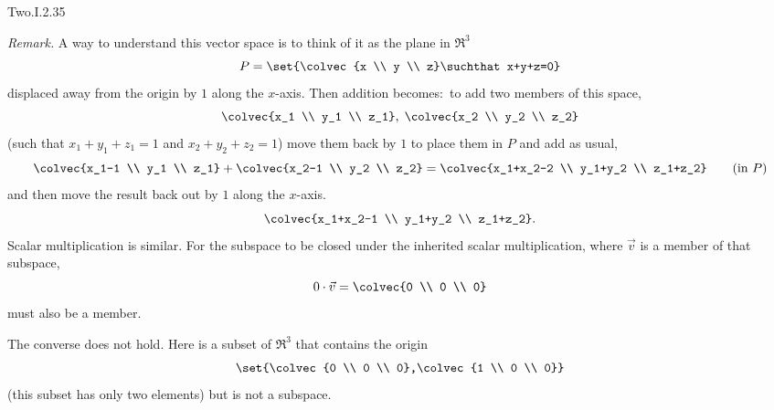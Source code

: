 \begin{ans}{Two.I.2.35}
\begin{exparts}
           \textit{Remark.}
           A way to understand this vector space is to think of it as
           the plane in $\Re^3$
           \begin{equation*}
             P=\set{\colvec{x \\ y \\ z}\suchthat x+y+z=0}
           \end{equation*}
           displaced away from the origin by $1$ along the $x$-axis.
           Then addition becomes:~to add two members of this space,
           \begin{equation*}
             \colvec{x_1 \\ y_1 \\ z_1},\;\colvec{x_2 \\ y_2 \\ z_2}
           \end{equation*}
           (such that $x_1+y_1+z_1=1$ and $x_2+y_2+z_2=1$)
           move them back by $1$ to place them in $P$ and
           add as usual,
           \begin{equation*}
             \colvec{x_1-1 \\ y_1 \\ z_1}+\colvec{x_2-1 \\ y_2 \\ z_2}
             =\colvec{x_1+x_2-2 \\ y_1+y_2 \\ z_1+z_2}
             \qquad\text{(in $P$)}
           \end{equation*}
           and then move the result back out by $1$ along the $x$-axis.
           \begin{equation*}
             \colvec{x_1+x_2-1 \\ y_1+y_2 \\ z_1+z_2}.
           \end{equation*}
           Scalar multiplication is similar.
         \partsitem For the subspace to be closed under the inherited scalar
           multiplication, where $\vec{v}$ is a member of that subspace,
           \begin{equation*}
             0\cdot\vec{v}=\colvec{0 \\ 0 \\ 0}
           \end{equation*}
           must also be a member.

           The converse does not hold.
           Here is a subset of $\Re^3$ that contains the origin
           \begin{equation*}
             \set{\colvec{0 \\ 0 \\ 0},\colvec{1 \\ 0 \\ 0}}
           \end{equation*}
           (this subset has only two elements) but is not a subspace.
      \end{exparts}
    
\end{ans}
